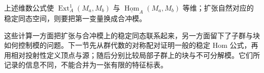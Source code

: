 上述维数公式使 \(\operatorname{Ext}_A^1(M_a,M_b)\) 与 \(\underline{\operatorname{Hom}}_A(M_a,M_b)\) 等维；扩张自然对应的稳定同态空间，则要把第一变量换成合冲模。

\ProseParagraphBreak

这些计算一方面把扩张与合冲模上的稳定同态联系起来，另一方面留下了子群与块如何控制模的问题。下一节先从群代数的对称配对证明一般的稳定 Hom 公式，再用相对投射性定义顶点与源；随后分别比较局部子群上的块与不可分解模。它们所记录的信息不同，不能合并为一张有限的特征标表。
